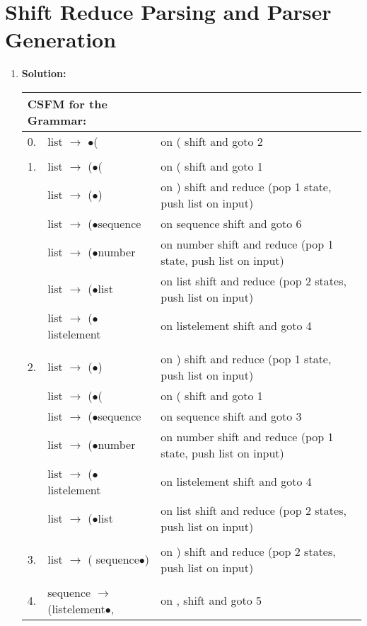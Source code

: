 \documentclass{article}
\begin{document}
    \section{Shift Reduce Parsing and Parser Generation}
    \begin{enumerate}
        \item \textbf{Solution:}
    \begin{center}
    \begin{tabular}{l l l}
\multicolumn{2}{l}{CSFM for the Grammar:} & \\
\hline
0. &  list $\to$ $\bullet$(        &       on ( shift and goto 2\\
& & \\
1. &  list $\to$ ($\bullet$(        &      on ( shift and goto 1\\
  &  list $\to$ ($\bullet$)          &    on ) shift and reduce (pop 1 state, push list on input)\\
  &  list $\to$ ($\bullet$sequence    &       on sequence shift and goto 6\\
  &  list $\to$ ($\bullet$number       &      on number shift and reduce (pop 1 state, push list on input)\\
  &  list $\to$ ($\bullet$list          &     on list shift and reduce (pop 2 states, push list on input)\\
  &  list $\to$ ($\bullet$listelement    &        on listelement shift and goto 4\\
& & \\
2. &  list $\to$ ($\bullet$)     &         on ) shift and reduce (pop 1 state, push list on input)\\
  &  list $\to$ ($\bullet$(       &       on ( shift and goto 1\\
  &  list $\to$ ($\bullet$sequence &          on sequence shift and goto 3\\
  &  list $\to$ ($\bullet$number    &         on number shift and reduce (pop 1 state, push list on input)\\
  &  list $\to$ ($\bullet$listelement&            on listelement shift and goto 4\\
  &  list $\to$ ($\bullet$list        &       on list shift and reduce (pop 2 states, push list on input)\\
& & \\
3. &  list $\to$ ( sequence$\bullet$)  &           on ) shift and reduce (pop 2 states, push list on input)\\
& & \\
4. &  sequence $\to$ (listelement$\bullet$,&       on , shift and goto 5\\

\end{tabular}
\end{center}
\end{enumerate}
\end{document}
